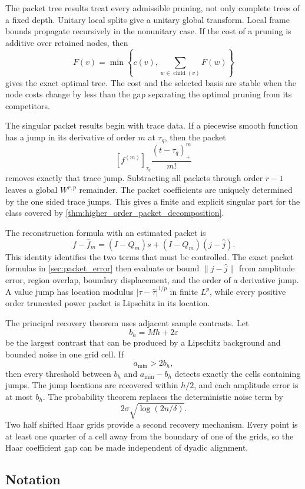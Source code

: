 \documentclass{aomart}
\theoremstyle{definition}
\theoremstyle{remark}
\newcommand{\jump}[1]{\left[#1\right]}
\begin{document}
The packet tree results treat every admissible pruning, not only complete trees of a fixed depth. Unitary local splits give a unitary global transform. Local frame bounds propagate recursively in the nonunitary case. If the cost of a pruning is additive over retained nodes, then
\[
F(v)
=
\min\left\{
c(v),
\sum_{w\in\operatorname{child}(v)}F(w)
\right\}
\]
gives the exact optimal tree. The cost and the selected basis are stable when the node costs change by less than the gap separating the optimal pruning from its competitors.

The singular packet results begin with trace data. If a piecewise smooth function has a jump in its derivative of order \(m\) at \(\tau_q\), then the packet
\[
\jump{f^{(m)}}_{\tau_q}
\frac{(t-\tau_q)_+^m}{m!}
\]
removes exactly that trace jump. Subtracting all packets through order \(r-1\) leaves a global \(W^{r,p}\) remainder. The packet coefficients are uniquely determined by the one sided trace jumps. This gives a finite and explicit singular part for the class covered by \cref{thm:higher_order_packet_decomposition}.

The reconstruction formula with an estimated packet is
\[
f-\widehat f_m
=
(I-Q_m)s+(I-Q_m)(j-\widehat j).
\]
This identity identifies the two terms that must be controlled. The exact packet formulas in \cref{sec:packet_error} then evaluate or bound \(\|j-\widehat j\|\) from amplitude error, region overlap, boundary displacement, and the order of a derivative jump. A value jump has location modulus \(|\tau-\widehat\tau|^{1/p}\) in finite \(L^p\), while every positive order truncated power packet is Lipschitz in its location.

The principal recovery theorem uses adjacent sample contrasts. Let
\[
b_h=Mh+2\varepsilon
\]
be the largest contrast that can be produced by a Lipschitz background and bounded noise in one grid cell. If
\[
a_{\min}>2b_h,
\]
then every threshold between \(b_h\) and \(a_{\min}-b_h\) detects exactly the cells containing jumps. The jump locations are recovered within \(h/2\), and each amplitude error is at most \(b_h\). The probability theorem replaces the deterministic noise term by
\[
2\sigma\sqrt{\log(2n/\delta)}.
\]
Two half shifted Haar grids provide a second recovery mechanism. Every point is at least one quarter of a cell away from the boundary of one of the grids, so the Haar coefficient gap can be made independent of dyadic alignment.

\subsection{Notation}
\end{document}
